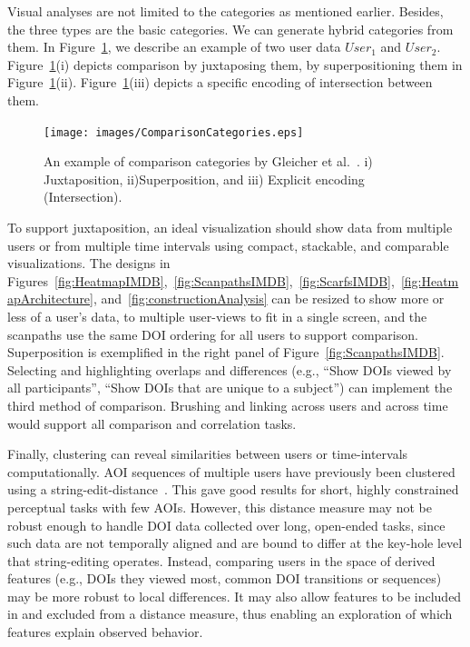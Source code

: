Visual analyses are not limited to the categories as mentioned earlier. Besides, the three types are the basic categories. We can generate hybrid categories from them. In Figure~\ref{fig:ComparisonCategories}, we describe an example of two user data $User_1$ and $User_2$. Figure~\ref{fig:ComparisonCategories}(i) depicts comparison by juxtaposing them, by superpositioning them in Figure~\ref{fig:ComparisonCategories}(ii). Figure~\ref{fig:ComparisonCategories}(iii) depicts a specific encoding of intersection between them.  
\begin{figure}[htbp]
  \centering
  \texttt{[image: images/ComparisonCategories.eps]}
  \caption{An example of comparison categories by Gleicher et al.~\cite{Glei11}. i) Juxtaposition, ii)Superposition, and iii) Explicit encoding (Intersection).}
	\label{fig:ComparisonCategories}
\end{figure}

To support juxtaposition, an ideal visualization should show data from multiple users or from multiple time intervals using compact, stackable, and comparable visualizations. The designs in Figures~\ref{fig:HeatmapIMDB},~\ref{fig:ScanpathsIMDB},~\ref{fig:ScarfsIMDB},~\ref{fig:HeatmapArchitecture}, and~\ref{fig:constructionAnalysis} can be resized to show more or less of a user's data, to multiple user-views to fit in a single screen, and the scanpaths use the same DOI ordering for all users to support comparison. Superposition is exemplified in the right panel of Figure~\ref{fig:ScanpathsIMDB}. Selecting and highlighting overlaps and differences (e.g., ``Show DOIs viewed by all participants'', ``Show DOIs that are unique to a subject'') can implement the third method of comparison. Brushing and linking across users and across time would support all comparison and correlation tasks.

Finally, clustering can reveal similarities between users or time-intervals computationally. AOI sequences of multiple users have previously been clustered using a string-edit-distance~\cite{Kur14}. This gave good results for short, highly constrained perceptual tasks with few AOIs. However, this distance measure may not be robust enough to handle DOI data collected over long, open-ended tasks, since such data are not temporally aligned and are bound to differ at the key-hole level that string-editing operates. Instead, comparing users in the space of derived features (e.g., DOIs they viewed most, common DOI transitions or sequences) may be more robust to local differences. It may also allow features to be included in and excluded from a distance measure, thus enabling an exploration of which features explain observed behavior.



